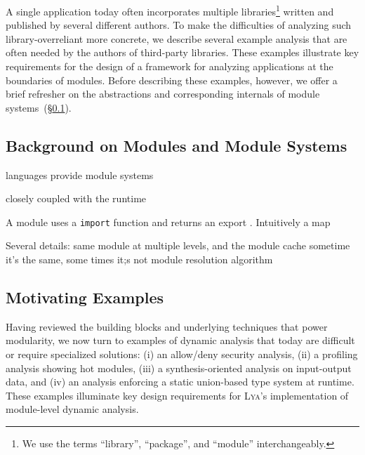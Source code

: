 \documentclass[letterpaper,twocolumn,10pt]{article}
\def\ie{{\em i.e.}, }
\newcommand{\ttt}[1]{\texttt{#1}}
\newcommand{\sx}[1]{(\S\ref{#1})}
\newcommand{\sys}{{\scshape Lya}\xspace}
\begin{document}
A single application today often incorporates multiple libraries\footnote{We use the terms ``library'', ``package'', and ``module'' interchangeably.} written and published by several different authors.
To make the difficulties of analyzing such library-overreliant more concrete, we describe several example analysis that are often needed by the authors of third-party libraries.
These examples illustrate key requirements for the design of a framework for analyzing applications at the boundaries of modules.
Before describing these examples, however, we offer a brief refresher on the abstractions and corresponding internals of module systems~\sx{bg1}.


\subsection{Background on Modules and Module Systems}
\label{bg1}

languages provide module systems

closely coupled with the runtime

A module uses a \ttt{import} function and returns an export .
Intuitively a map

Several details:
  same module at multiple levels, and the module cache
  sometime it's the same, some times it;s not
  module resolution algorithm

\subsection{Motivating Examples}

Having reviewed the building blocks and underlying techniques that power modularity, we now turn to examples of dynamic analysis that today are difficult or require specialized solutions:
  (i) an allow/deny security analysis,
  (ii) a profiling analysis showing hot modules,
  (iii) a synthesis-oriented analysis on input-output data, and
  (iv) an analysis enforcing a static union-based type system at runtime.
These examples illuminate key design requirements for \sys's implementation of module-level dynamic analysis.
\end{document}

